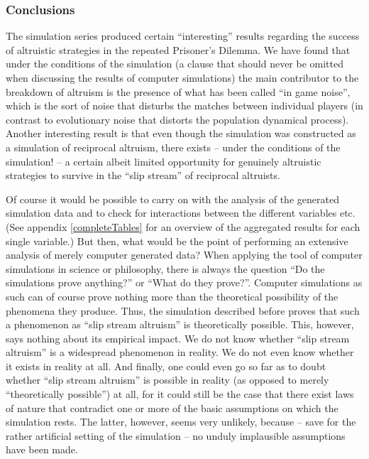 \subsubsection{Conclusions}
\label{conclusionsRefinedModel}
The simulation series produced certain ``interesting'' results regarding the
success of altruistic strategies in the repeated Prisoner's Dilemma. We have
found that under the conditions of the simulation (a clause that should never
be omitted when discussing the results of computer simulations) the main
contributor to the breakdown of altruism is the presence of what has been
called ``in game noise'', which is the sort of noise that disturbs the matches
between individual players (in contrast to evolutionary noise that distorts
the population dynamical process). Another interesting result is that even
though the simulation was constructed as a simulation of reciprocal altruism,
there exists -- under the conditions of the simulation! -- a certain albeit
limited opportunity for genuinely altruistic strategies to survive in the
``slip stream'' of reciprocal altruists.

Of course it would be possible to carry on with the analysis of the generated
simulation data and to check for interactions between the different variables
etc. (See appendix \ref{completeTables} for an overview of the
aggregated results for each single variable.)
But then, what would be the point of performing an extensive analysis of
merely computer generated data? When applying the tool of computer simulations
in science or philosophy, there
is always the question ``Do the simulations prove anything?'' or ``What do
they prove?''.  Computer simulations as such can of course prove nothing more
than the theoretical possibility of the phenomena they produce. Thus, the
simulation described before proves that such a phenomenon as ``slip stream
altruism'' is theoretically possible. This, however, says nothing about its
empirical impact.  We do not know whether ``slip stream altruism'' is a
widespread phenomenon in reality. We do not even know whether it
exists in reality at all.  And finally, one could even go so far as to doubt
whether ``slip stream altruism'' is possible in reality (as opposed to merely
``theoretically possible'') at all, for it could still be the case that there
exist laws of nature that contradict one or more of the basic assumptions on
which the simulation rests. The latter, however, seems very unlikely, because
-- save for the rather artificial setting of the simulation -- no unduly
implausible assumptions have been made.

